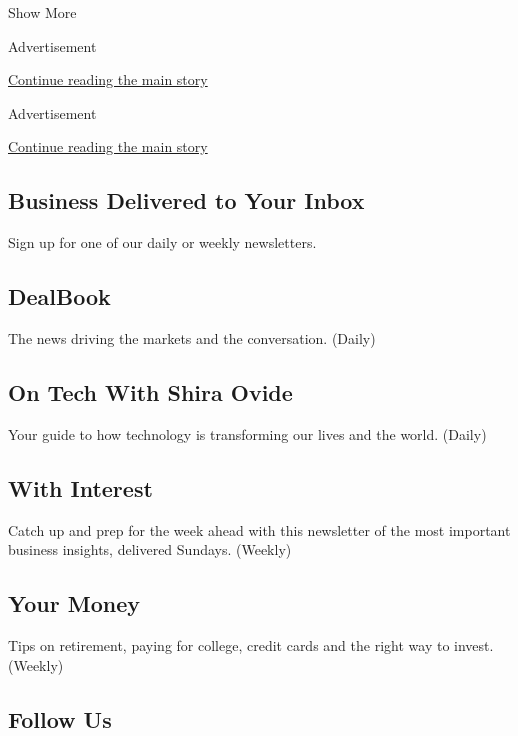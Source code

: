 Show More

Advertisement

\protect\hyperlink{after-mid2}{Continue reading the main story}

Advertisement

\protect\hyperlink{after-mktg}{Continue reading the main story}

\hypertarget{business-delivered-to-your-inbox}{%
\subsection{Business Delivered to Your
Inbox}\label{business-delivered-to-your-inbox}}

Sign up for one of our daily or weekly newsletters.

\hypertarget{dealbook}{%
\subsection{DealBook}\label{dealbook}}

The news driving the markets and the conversation. (Daily)

\hypertarget{on-tech-with-shira-ovide}{%
\subsection{On Tech With Shira Ovide}\label{on-tech-with-shira-ovide}}

Your guide to how technology is transforming our lives and the world.
(Daily)

\hypertarget{with-interest}{%
\subsection{With Interest}\label{with-interest}}

Catch up and prep for the week ahead with this newsletter of the most
important business insights, delivered Sundays. (Weekly)

\hypertarget{your-money-1}{%
\subsection{Your Money}\label{your-money-1}}

Tips on retirement, paying for college, credit cards and the right way
to invest. (Weekly)

\hypertarget{follow-us}{%
\subsection{Follow Us}\label{follow-us}}

